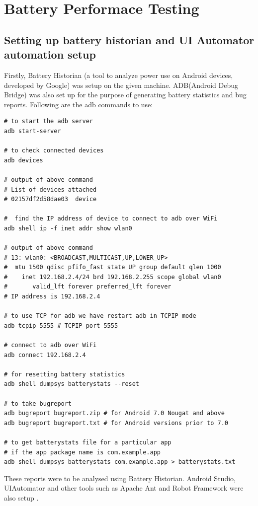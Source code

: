 \setlength\parindent{0pt}

\chapter{Battery Performace Testing}

\section{Setting up battery historian and UI Automator automation setup} Firstly, Battery Historian (a tool to analyze power use on Android devices, developed by Google) was setup on the given machine. ADB(Android Debug Bridge) was also set up for the purpose of generating battery statistics and bug reports. Following are the adb commands to use:\cite{adb}
\begin{lstlisting}[style=ShellStyle]
# to start the adb server
adb start-server

# to check connected devices
adb devices

# output of above command
# List of devices attached
# 02157df2d58dae03	device

#  find the IP address of device to connect to adb over WiFi
adb shell ip -f inet addr show wlan0

# output of above command
# 13: wlan0: <BROADCAST,MULTICAST,UP,LOWER_UP> 
#  mtu 1500 qdisc pfifo_fast state UP group default qlen 1000
#    inet 192.168.2.4/24 brd 192.168.2.255 scope global wlan0
#       valid_lft forever preferred_lft forever
# IP address is 192.168.2.4

# to use TCP for adb we have restart adb in TCPIP mode
adb tcpip 5555 # TCPIP port 5555

# connect to adb over WiFi
adb connect 192.168.2.4

# for resetting battery statistics
adb shell dumpsys batterystats --reset

# to take bugreport
adb bugreport bugreport.zip # for Android 7.0 Nougat and above
adb bugreport bugreport.txt # for Android versions prior to 7.0 

# to get batterystats file for a particular app 
# if the app package name is com.example.app
adb shell dumpsys batterystats com.example.app > batterystats.txt
\end{lstlisting}
These reports were to be analysed using Battery Historian. Android Studio, UIAutomator and other tools such as Apache Ant and Robot Framework were also setup .
\\

